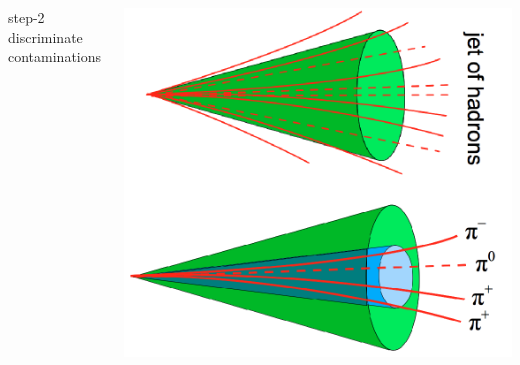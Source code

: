 \begin{frame}{}
\begin{columns}[c]
\begin{block}{step-2 discriminate contaminations}
\begin{itemize}
            
            
        \end{itemize}
        \end{block}

        \includegraphics[width=\textwidth]{slides/figures/tausignature_trans.png}
    \end{columns}
    
\end{frame}